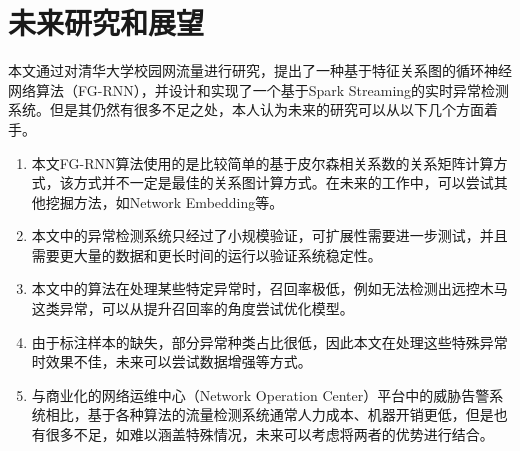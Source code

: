 \section{未来研究和展望}
本文通过对清华大学校园网流量进行研究，提出了一种基于特征关系图的循环神经网络算法（FG-RNN），并设计和实现了一个基于Spark Streaming的实时异常检测系统。但是其仍然有很多不足之处，本人认为未来的研究可以从以下几个方面着手。
\begin{enumerate}
    \item 本文FG-RNN算法使用的是比较简单的基于皮尔森相关系数的关系矩阵计算方式，该方式并不一定是最佳的关系图计算方式。在未来的工作中，可以尝试其他挖掘方法，如Network Embedding等。
    \item 本文中的异常检测系统只经过了小规模验证，可扩展性需要进一步测试，并且需要更大量的数据和更长时间的运行以验证系统稳定性。
    \item 本文中的算法在处理某些特定异常时，召回率极低，例如无法检测出远控木马这类异常，可以从提升召回率的角度尝试优化模型。
    \item 由于标注样本的缺失，部分异常种类占比很低，因此本文在处理这些特殊异常时效果不佳，未来可以尝试数据增强等方式。
    \item 与商业化的网络运维中心（Network Operation Center）平台中的威胁告警系统相比，基于各种算法的流量检测系统通常人力成本、机器开销更低，但是也有很多不足，如难以涵盖特殊情况，未来可以考虑将两者的优势进行结合。
\end{enumerate}
